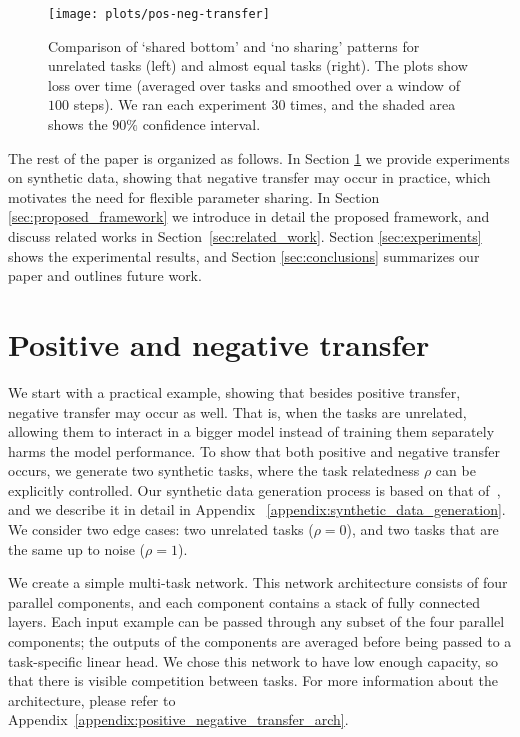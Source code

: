 \documentclass[conference]{IEEEtran}
\begin{document}
\begin{figure*}[ht]
\begin{center}
\texttt{[image: plots/pos-neg-transfer]}
\end{center}
\caption{Comparison of `shared bottom' and `no sharing' patterns for unrelated tasks (left) and almost equal tasks (right). The plots show loss over time (averaged over tasks and smoothed over a window of $100$ steps). We ran each experiment $30$ times, and the shaded area shows the $90\%$ confidence interval.}\label{fig:pos_neg_transfer}
\end{figure*}

The rest of the paper is organized as follows.
In Section \ref{sec:positive_negative_transfer} we provide experiments on synthetic data, showing that negative transfer may occur in practice, which motivates the need for flexible parameter sharing. In Section \ref{sec:proposed_framework} we introduce in detail the proposed framework, and discuss related works in Section~\ref{sec:related_work}. Section \ref{sec:experiments} shows the experimental results, and Section \ref{sec:conclusions} summarizes our paper and outlines future work.

\section{Positive and negative transfer}\label{sec:positive_negative_transfer}

We start with a practical example, showing that besides positive transfer, negative transfer may occur as well. That is, when the tasks are unrelated, allowing them to interact in a bigger model instead of training them separately harms the model performance. 
To show that both positive and negative transfer occurs, we generate two synthetic tasks, where the task relatedness $\rho$ can be explicitly controlled. Our synthetic data generation process is based on that of~\cite{MMoE-KDD-2018}, and we describe it in detail in Appendix
~\ref{appendix:synthetic_data_generation}.
We consider two edge cases: two unrelated tasks ($\rho = 0$), and two tasks that are the same up to noise ($\rho = 1$).

We create a simple multi-task network. This network architecture consists of four parallel components, and each component contains a stack of fully connected layers. Each input example can be passed through any subset of the four parallel components; the outputs of the components are averaged before being passed to a task-specific linear head. We chose this network to have low enough capacity, so that there is visible competition between tasks. For more information about the architecture, please refer to Appendix~\ref{appendix:positive_negative_transfer_arch}.
\end{document}
